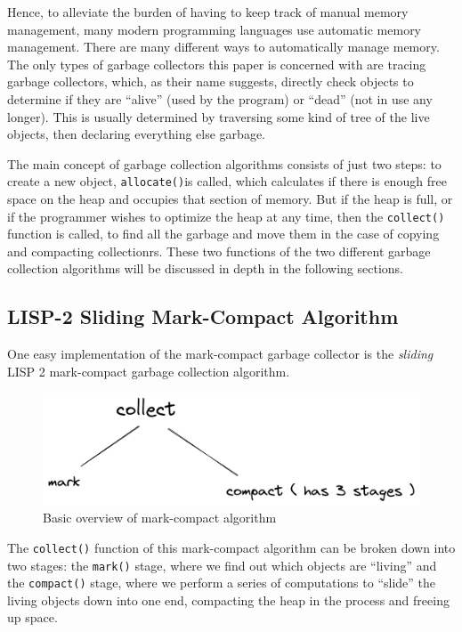 \documentclass[index]{subfiles}
\begin{document}
Hence, to alleviate the burden of having to keep track of manual memory management, many modern programming languages use automatic memory management. There are many different ways to automatically manage memory. The only types of garbage collectors this paper is concerned with are tracing garbage collectors, which, as their name suggests, directly check objects to determine if they are ``alive'' (used by the program) or ``dead'' (not in use any longer)\cite{a_unified_theory_of_garbage_collection}. This is usually determined by traversing some kind of tree of the live objects\cite[Chapter~1]{gc_handbook}, then declaring everything else garbage.

The main concept of garbage collection algorithms consists of just two steps: to create a new object, \verb+allocate()+is called, which calculates if there is enough free space on the heap and occupies that section of memory. But if the heap is full, or if the programmer wishes to optimize the heap at any time, then the \verb+collect()+\cite{gc_handbook} function is called, to find all the garbage and move them in the case of copying and compacting collectionrs. These two functions of the two different garbage collection algorithms will be discussed in depth in the following sections.

\subsection{LISP-2 Sliding Mark-Compact Algorithm}

One easy implementation of the mark-compact garbage collector is the \textit{sliding} LISP 2 mark-compact garbage collection algorithm.

\begin{figure}[H]
    \centering
    \includegraphics[scale=0.3]{pics/mark-compact-overview.png}
    \caption{Basic overview of mark-compact algorithm}
\end{figure}

The \verb+collect()+ function of this mark-compact algorithm can be broken down into two stages: the \verb+mark()+ stage, where we find out which objects are ``living'' and the \verb+compact()+ stage, where we perform a series of computations to ``slide'' the living objects down into one end, compacting the heap in the process and freeing up space\cite[Chapter~3]{gc_handbook}.
\end{document}
